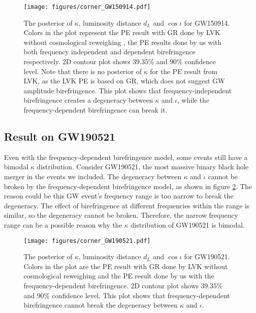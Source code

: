 \documentclass[aps,prd,twocolumn,superscriptaddress,preprintnumbers,floatfix,nofootinbib]{revtex4-2}
\begin{document}
\begin{figure}[h]
    \texttt{[image: figures/corner\_GW150914.pdf]}
    \caption{
        The posterior of $\kappa$, luminosity distance $d_L$ and $\cos{\iota}$ for GW150914.
        Colors in the plot represent the PE result with GR done by LVK without cosmological reweighing \citep{GWTC-2.1, GWTC-3}, the PE results done by us with both frequency independent and dependent birefringence respectively.
        2D contour plot shows $39.35\%$ and $90\%$ confidence level.
        Note that there is no posterior of $\kappa$ for the PE result from LVK, as the LVK PE is based on GR, which does not suggest GW amplitude birefringence.
        This plot shows that frequency-independent birefringence creates a degeneracy between $\kappa$ and $\iota$, while the frequency-dependent birefringence can break it.
    }
    \label{fig:corner_GW150914}
\end{figure}

\subsection{Result on GW190521}
Even with the frequency-dependent birefringence model, some events still have a bimodal $\kappa$ distribution.
Consider GW190521, the most massive binary black hole merger in the events we included.
The degeneracy between $\kappa$ and $\iota$ cannot be broken by the frequency-dependent birefringence model, as shown in figure \ref{fig:corner_GW190521}.
The reason could be this GW event's frequency range is too narrow to break the degeneracy.
The effect of birefringence at different frequencies within the range is similar, so the degeneracy cannot be broken.
Therefore, the narrow frequency range can be a possible reason why the $\kappa$ distribution of GW190521 is bimodal.

\begin{figure}[h]
    \texttt{[image: figures/corner\_GW190521.pdf]}
    \caption{
        The posterior of $\kappa$, luminosity distance $d_L$ and $\cos{\iota}$ for GW190521.
        Colors in the plot are the PE result with GR done by LVK without cosmological reweighing \citep{GWTC-2.1, GWTC-3} and the PE result done by us with the frequency-dependent birefringence.
        2D contour plot shows $39.35\%$ and $90\%$ confidence level.
        This plot shows that frequency-dependent birefringence cannot break the degeneracy between $\kappa$ and $\iota$.
    }
    \label{fig:corner_GW190521}
\end{figure}
\end{document}
